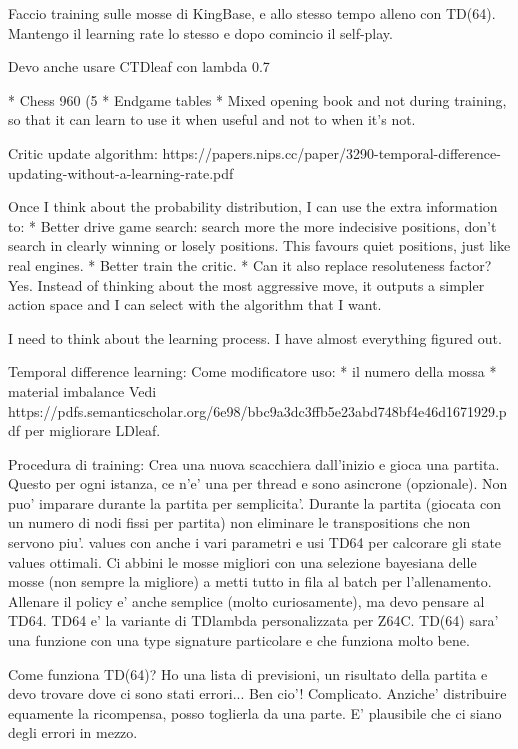 Faccio training sulle mosse di KingBase, e allo stesso tempo alleno con TD(64).
Mantengo il learning rate lo stesso e dopo comincio il self-play.

Devo anche usare CTDleaf con lambda 0.7


* Chess 960 (5%
* Endgame tables
* Mixed opening book and not during training, so that it can learn to use it
  when useful and not to when it's not.


Critic update algorithm: https://papers.nips.cc/paper/3290-temporal-difference-updating-without-a-learning-rate.pdf

Once I think about the probability distribution, I can use the extra information
to:
* Better drive game search: search more the more indecisive positions, don't
  search in clearly winning or losely positions. This favours quiet positions,
  just like real engines.
* Better train the critic.
* Can it also replace resoluteness factor? Yes. Instead of thinking about the
  most aggressive move, it outputs a simpler action space and I can select with
  the algorithm that I want.

I need to think about the learning process. I have almost everything figured
out.

Temporal difference learning:
Come modificatore uso:
* il numero della mossa
* material imbalance
Vedi
https://pdfs.semanticscholar.org/6e98/bbc9a3dc3ffb5e23abd748bf4e46d1671929.pdf
per migliorare LDleaf.

Procedura di training:
Crea una nuova scacchiera dall'inizio e gioca una partita. Questo per ogni
istanza, ce n'e' una per thread e sono asincrone (opzionale). Non puo' imparare
durante la partita per semplicita'. Durante la partita (giocata con un numero di
nodi fissi per partita) non eliminare le transpositions che non servono piu'.
values con anche i vari parametri e usi TD64 per calcorare gli state values
ottimali. Ci abbini le mosse migliori con una selezione bayesiana delle mosse
(non sempre la migliore) a metti tutto in fila al batch per l'allenamento.
Allenare il policy e' anche semplice (molto curiosamente), ma devo pensare al
TD64. TD64 e' la variante di TDlambda personalizzata per Z64C. TD(64) sara' una
funzione con una type signature particolare e che funziona molto bene.

Come funziona TD(64)?
Ho una lista di previsioni, un risultato della partita e devo trovare dove ci
sono stati errori... Ben cio'! Complicato. Anziche' distribuire equamente la
ricompensa, posso toglierla da una parte. E' plausibile che ci siano degli
errori in mezzo.

